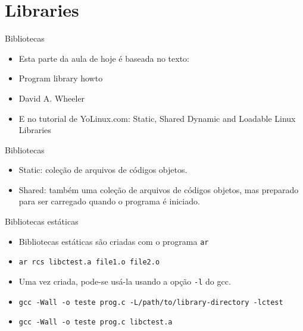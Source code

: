 %
%
%

%
%
%



\subtitle{Conceitos e técnicas}

\date{24/4/2012}



\begin{frame}
  \maketitle
\end{frame}

\section*{Libraries}

\begin{frame}{Bibliotecas} 
  \begin{itemize}
  \item Esta parte da aula de hoje é baseada no texto:
  \item Program library howto
  \item David A. Wheeler
  \pause 
  \item E no tutorial de YoLinux.com: Static, Shared Dynamic and Loadable Linux Libraries
  \end{itemize}
\end{frame}

\begin{frame}{Bibliotecas} 
  \begin{itemize}
   \item Static: coleção de arquivos de códigos objetos.
   \pause
   \item Shared: também uma coleção de arquivos de códigos objetos, mas preparado
         para ser carregado quando o programa é iniciado.
  \end{itemize}
\end{frame}

\begin{frame}{Bibliotecas estáticas} 
  \begin{itemize}
   \item Bibliotecas estáticas são criadas com o programa \texttt{ar}
  \pause
  \item \texttt{ar rcs libctest.a file1.o file2.o}
  \pause
  \item Uma vez criada, pode-se usá-la usando a opção \texttt{-l} do gcc.
  \pause
  \item \texttt{gcc -Wall -o teste prog.c -L/path/to/library-directory -lctest}
  \pause
  \item \texttt{gcc -Wall -o teste prog.c libctest.a}
  \end{itemize}
\end{frame}



